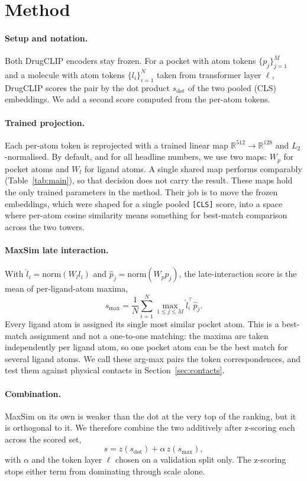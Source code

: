 \documentclass[10pt,letterpaper,twocolumn]{article}
\begin{document}
\section{Method}

\paragraph{Setup and notation.} Both DrugCLIP encoders stay frozen. For a pocket with atom tokens $\{p_j\}_{j=1}^{M}$ and a molecule with atom tokens $\{l_i\}_{i=1}^{N}$ taken from transformer layer $\ell$, DrugCLIP scores the pair by the dot product $s_{\text{dot}}$ of the two pooled (CLS) embeddings. We add a second score computed from the per-atom tokens.

\paragraph{Trained projection.} Each per-atom token is reprojected with a trained linear map $\mathbb{R}^{512} \to \mathbb{R}^{128}$ and $L_2$-normalised. By default, and for all headline numbers, we use two maps: $W_p$ for pocket atoms and $W_l$ for ligand atoms. A single shared map performs comparably (Table~\ref{tab:main}), so that decision does not carry the result. These maps hold the only trained parameters in the method. Their job is to move the frozen embeddings, which were shaped for a single pooled \texttt{[CLS]} score, into a space where per-atom cosine similarity means something for best-match comparison across the two towers.

\paragraph{MaxSim late interaction.} With $\hat{l}_i = \mathrm{norm}(W_l l_i)$ and $\hat{p}_j = \mathrm{norm}(W_p p_j)$, the late-interaction score is the mean of per-ligand-atom maxima,
\begin{equation}
s_{\max} = \frac{1}{N}\sum_{i=1}^{N} \max_{1 \le j \le M} \hat{l}_i^{\top} \hat{p}_j .
\end{equation}
Every ligand atom is assigned its single most similar pocket atom. This is a best-match assignment and not a one-to-one matching: the maxima are taken independently per ligand atom, so one pocket atom can be the best match for several ligand atoms. We call these arg-max pairs the token correspondences, and test them against physical contacts in Section~\ref{sec:contacts}.

\paragraph{Combination.} MaxSim on its own is weaker than the dot at the very top of the ranking, but it is orthogonal to it. We therefore combine the two additively after z-scoring each across the scored set,
\begin{equation}
s = z(s_{\text{dot}}) + \alpha\, z(s_{\max}),
\end{equation}
with $\alpha$ and the token layer $\ell$ chosen on a validation split only. The z-scoring stops either term from dominating through scale alone.
\end{document}
